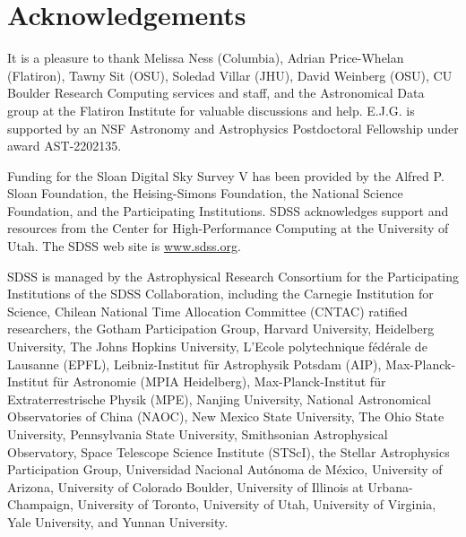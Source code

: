\documentclass[modern]{aastex631}
\begin{document}
\section{Acknowledgements}
It is a pleasure to thank
  Melissa Ness (Columbia),
  Adrian Price-Whelan (Flatiron),
  Tawny Sit (OSU),
  Soledad Villar (JHU),
  David Weinberg (OSU),
  CU Boulder Research Computing services and staff,
  and the Astronomical Data group at the Flatiron Institute
for valuable discussions and help.
E.J.G. is supported by an NSF Astronomy and Astrophysics Postdoctoral Fellowship under award AST-2202135.

Funding for the Sloan Digital Sky Survey V has been provided by the Alfred P. Sloan Foundation, the Heising-Simons Foundation, the National Science Foundation, and the Participating Institutions. SDSS acknowledges support and resources from the Center for High-Performance Computing at the University of Utah. The SDSS web site is \url{www.sdss.org}.

SDSS is managed by the Astrophysical Research Consortium for the Participating Institutions of the SDSS Collaboration, including the Carnegie Institution for Science, Chilean National Time Allocation Committee (CNTAC) ratified researchers, the Gotham Participation Group, Harvard University, Heidelberg University, The Johns Hopkins University, L’Ecole polytechnique f\'{e}d\'{e}rale de Lausanne (EPFL), Leibniz-Institut f{\"u}r Astrophysik Potsdam (AIP), Max-Planck-Institut f{\"u}r Astronomie (MPIA Heidelberg), Max-Planck-Institut f{\"u}r Extraterrestrische Physik (MPE), Nanjing University, National Astronomical Observatories of China (NAOC), New Mexico State University, The Ohio State University, Pennsylvania State University, Smithsonian Astrophysical Observatory, Space Telescope Science Institute (STScI), the Stellar Astrophysics Participation Group, Universidad Nacional Aut\'{o}noma de M\'{e}xico, University of Arizona, University of Colorado Boulder, University of Illinois at Urbana-Champaign, University of Toronto, University of Utah, University of Virginia, Yale University, and Yunnan University.




{}

\end{document}
